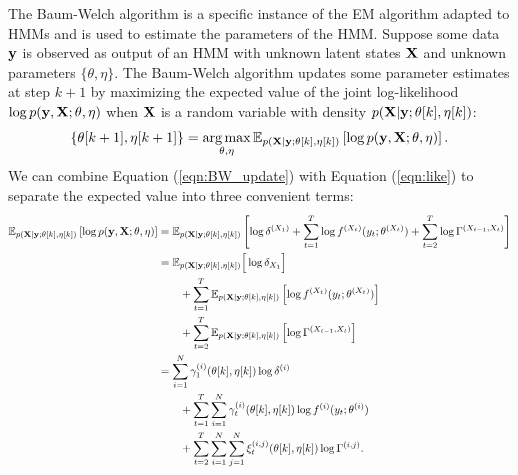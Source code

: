 The Baum-Welch algorithm is a specific instance of the EM algorithm adapted to HMMs and is used to estimate the parameters of the HMM. Suppose some data $\mathbf{y}$ is observed as output of an HMM with unknown latent states $\mathbf{X}$ and unknown parameters $\{\theta,\eta\}$. The Baum-Welch algorithm updates some parameter estimates at step $k+1$ by maximizing the expected value of the joint log-likelihood $\log p(\mathbf{y},\mathbf{X}; \theta,\eta)$ when $\mathbf{X}$ is a random variable with density $p(\mathbf{X} | \mathbf{y};\theta[k],\eta[k])$:
%
\begin{equation}
    \left\{\theta[k+1],\eta[k+1]\right\} = \operatorname*{arg\,max}_{\theta,\eta} \mathbb{E}_{p(\mathbf{X} | \mathbf{y};\theta[k],\eta[k])} \left[\log p(\mathbf{y},\mathbf{X};\theta,\eta)\right].
    \label{eqn:BW_update}
\end{equation}
%
We can combine Equation (\ref{eqn:BW_update}) with Equation (\ref{eqn:like}) to separate the expected value into three convenient terms:
\begin{align*}
    \mathbb{E}_{p(\mathbf{X} \mid \mathbf{y};\theta[k],\eta[k])}\left[\log p(\mathbf{y},\mathbf{X};\theta,\eta) \right] &= \mathbb{E}_{p(\mathbf{X} \mid \mathbf{y};\theta[k],\eta[k])} \left[\log \delta^{(X_1)} + \sum_{t=1}^T \log f^{(X_t)}(y_t;\theta^{(X_t)}) + \sum_{t=2}^{T} \log \Gamma^{(X_{t-1},X_{t})} \right] \\
    &= \mathbb{E}_{p(\mathbf{X} \mid \mathbf{y};\theta[k],\eta[k])} \Big[\log \delta_{X_1}\Big] \\ & \qquad + \sum_{t = 1}^T \mathbb{E}_{p(\mathbf{X} \mid \mathbf{y};\theta[k],\eta[k])} \left[ \log f^{(X_t)}(y_t;\theta^{(X_t)})\right] \\ & \qquad + \sum_{t=2}^{T} \mathbb{E}_{p(\mathbf{X} \mid \mathbf{y};\theta[k],\eta[k])} \left[ \log \Gamma^{(X_{t-1},X_{t})} \right] \\
    &= \sum_{i=1}^N \gamma^{(i)}_1(\theta[k],\eta[k]) \log \delta^{(i)} \\ & \qquad + \sum_{t = 1}^T \sum_{i=1}^N \gamma^{(i)}_t(\theta[k],\eta[k]) \log f^{(i)}(y_t;\theta^{(i)}) \\
    & \qquad + \sum_{t=2}^{T} \sum_{i=1}^N \sum_{j=1}^N \xi_t^{(i,j)}(\theta[k],\eta[k]) \log \Gamma^{(i,j)}.
\end{align*}

